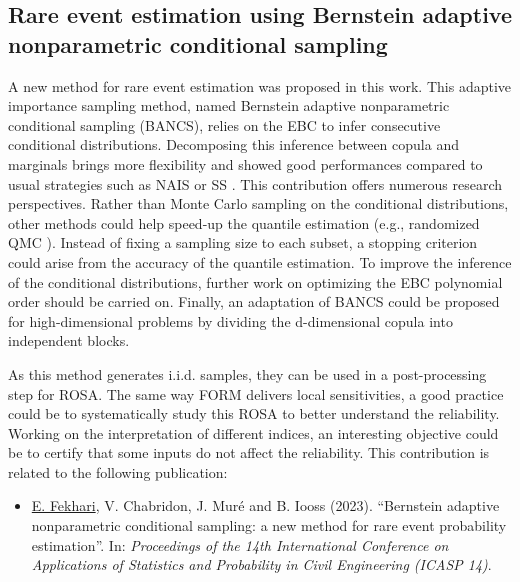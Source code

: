 \subsection*{Rare event estimation using Bernstein adaptive nonparametric conditional sampling}

A new method for rare event estimation was proposed in this work. 
This adaptive importance sampling method, named Bernstein adaptive nonparametric conditional sampling (BANCS), relies on the EBC to infer consecutive conditional distributions. 
Decomposing this inference between copula and marginals brings more flexibility and showed good performances compared to usual strategies such as NAIS \citep{zhang_1996_NIS} or SS \citep{AuBeck2001}. 
This contribution offers numerous research perspectives. 
Rather than Monte Carlo sampling on the conditional distributions, other methods could help speed-up the quantile estimation (e.g., randomized QMC \citep{tuffin_2019}). 
Instead of fixing a sampling size to each subset, a stopping criterion could arise from the accuracy of the quantile estimation. 
To improve the inference of the conditional distributions, further work on optimizing the EBC polynomial order should be carried on. 
Finally, an adaptation of BANCS could be proposed for high-dimensional problems by dividing the d-dimensional copula into independent blocks.   

As this method generates i.i.d. samples, they can be used in a post-processing step for ROSA.
The same way FORM delivers local sensitivities, a good practice could be to systematically study this ROSA to better understand the reliability. 
Working on the interpretation of different indices, an interesting objective could be to certify that some inputs do not affect the reliability. 
This contribution is related to the following publication:
\begin{itemize}
    \footnotesize
    \item[\ding{125}] \underline{E. Fekhari}, V. Chabridon, J. Muré and B. Iooss (2023). ``Bernstein adaptive nonparametric conditional sampling: a new method for rare event probability estimation''. In: \textit{Proceedings of the 14th International Conference on Applications of Statistics and Probability in Civil Engineering (ICASP 14)}.
\end{itemize}




